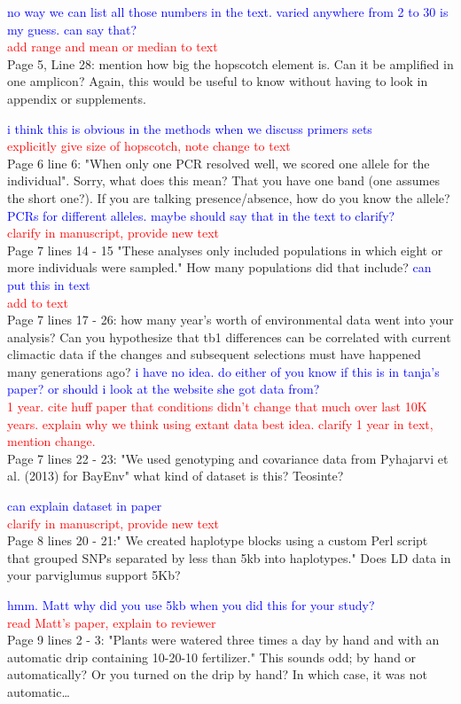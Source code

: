\documentclass[11pt]{article}
\newcommand{\res}[1]{\noindent \textcolor{blue}{{#1}} \\}
\newcommand{\jri}[1]{\noindent \textcolor{red}{{#1}} \\}
\begin{document}
\res{no way we can list all those numbers in the text. varied anywhere from 2 to 30 is my guess. can say that?}
\jri{add range and mean or median to text}

Page 5, Line 28: mention how big the hopscotch element is.  Can it be amplified in one amplicon? Again, this would be useful to know without having to look in appendix or supplements. 

\res{i think this is obvious in the methods when we discuss primers sets}
\jri{explicitly give size of hopscotch, note change to text}

Page 6 line 6: "When only one PCR resolved well, we scored one allele for the individual".  Sorry, what does this mean? That you have one band (one assumes the short one?). If you are talking presence/absence, how do you know the allele? \res{PCRs for different alleles. maybe should say that in the text to clarify?}
\jri{clarify in manuscript, provide new text}

Page 7 lines 14 - 15 "These analyses only included populations in which eight or more individuals were sampled."  How many populations did that include? 
\res{can put this in text}
\jri{add to text}

Page 7 lines 17 - 26: how many year's worth of environmental data went into your analysis? Can you hypothesize that tb1 differences can be correlated with current climactic data if the changes and subsequent selections must have happened many generations ago? 
\res{i have no idea. do either of you know if this is in tanja's paper? or should i look at the website she got data from?}
\jri{1 year. cite huff paper that conditions didn't change that much over last 10K years. explain why we think using extant data best idea. clarify 1 year in text, mention change.}

Page 7 lines 22 - 23: "We used genotyping and covariance data from Pyhajarvi et al. (2013) for BayEnv" what kind of dataset is this? Teosinte? 

\res{can explain dataset in paper}
\jri{clarify in manuscript, provide new text}

Page 8 lines 20 - 21:" We created haplotype blocks using a custom Perl script that grouped SNPs separated by less than 5kb into haplotypes." Does LD data in your parviglumus support 5Kb? 

\res{hmm. Matt why did you use 5kb when you did this for your study?}
\jri{read Matt's paper, explain to reviewer}

Page 9 lines 2 - 3: "Plants were watered three times a day by hand and with an automatic drip containing 10-20-10 fertilizer." This sounds odd; by hand or automatically? Or you turned on the drip by hand? In which case, it was not automatic… 
\end{document}
